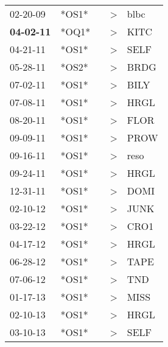 \begin{supertabular}{p{0.07\textwidth}p{0.06\textwidth}p{0.02\textwidth}p{0.02\textwidth}p{0.06\textwidth}}
          02-20-09\textsuperscript{} &  *OS1* &   &  \textgreater &  blbc\textsuperscript{} \\
 \textbf{04-02-11\textsuperscript{}} &  *OQ1* &   &  \textgreater &  KITC\textsuperscript{} \\
          04-21-11\textsuperscript{} &  *OS1* &   &  \textgreater &  SELF\textsuperscript{} \\
          05-28-11\textsuperscript{} &  *OS2* &   &  \textgreater &  BRDG\textsuperscript{} \\
          07-02-11\textsuperscript{} &  *OS1* &   &  \textgreater &  BILY\textsuperscript{} \\
          07-08-11\textsuperscript{} &  *OS1* &   &  \textgreater &  HRGL\textsuperscript{} \\
          08-20-11\textsuperscript{} &  *OS1* &   &  \textgreater &  FLOR\textsuperscript{} \\
          09-09-11\textsuperscript{} &  *OS1* &   &  \textgreater &  PROW\textsuperscript{} \\
          09-16-11\textsuperscript{} &  *OS1* &   &  \textgreater &  reso\textsuperscript{} \\
          09-24-11\textsuperscript{} &  *OS1* &   &  \textgreater &  HRGL\textsuperscript{} \\
          12-31-11\textsuperscript{} &  *OS1* &   &  \textgreater &  DOMI\textsuperscript{} \\
          02-10-12\textsuperscript{} &  *OS1* &   &  \textgreater &  JUNK\textsuperscript{} \\
          03-22-12\textsuperscript{} &  *OS1* &   &  \textgreater &  CRO1\textsuperscript{} \\
          04-17-12\textsuperscript{} &  *OS1* &   &  \textgreater &  HRGL\textsuperscript{} \\
          06-28-12\textsuperscript{} &  *OS1* &   &  \textgreater &  TAPE\textsuperscript{} \\
          07-06-12\textsuperscript{} &  *OS1* &   &  \textgreater &   TND\textsuperscript{} \\
          01-17-13\textsuperscript{} &  *OS1* &   &  \textgreater &  MISS\textsuperscript{} \\
          02-10-13\textsuperscript{} &  *OS1* &   &  \textgreater &  HRGL\textsuperscript{} \\
          03-10-13\textsuperscript{} &  *OS1* &   &  \textgreater &  SELF\textsuperscript{} \\

\end{supertabular}
